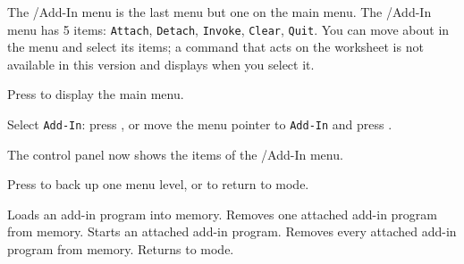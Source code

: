 The /Add-In menu is the last menu but one on the main menu. The /Add-In menu has 5 items: \texttt{Attach}, \texttt{Detach}, \texttt{Invoke}, \texttt{Clear}, \texttt{Quit}.  You can move about in the menu and select its items; a command that acts on the worksheet is not available in this version and displays  when you select it.
\begin{Steps123}
\item Press  to display the main menu.
\item Select \texttt{Add-In}: press , or move the menu pointer to \texttt{Add-In} and press .
\item The control panel now shows the items of the /Add-In menu.
\item Press  to back up one menu level, or  to return to  mode.
\end{Steps123}
\begin{Options}
 Loads an add-in program into memory.
 Removes one attached add-in program from memory.
 Starts an attached add-in program.
 Removes every attached add-in program from memory.
 Returns to  mode.
\end{Options}
